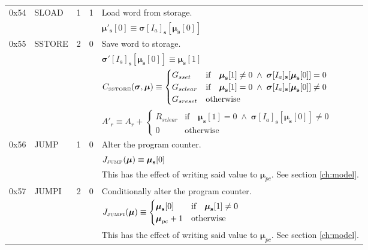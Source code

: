 \documentclass[9pt,oneside]{amsart}
\begin{document}
\begin{tabular*}{\columnwidth}[h]{rlrrl}
\midrule
0x54 & {\small SLOAD} & 1 & 1 & Load word from storage. \\
&&&& $\boldsymbol{\mu}'_\mathbf{s}[0] \equiv \boldsymbol{\sigma}[I_a]_\mathbf{s}[\boldsymbol{\mu}_\mathbf{s}[0]]$ \\
\midrule
0x55 & {\small SSTORE} & 2 & 0 & Save word to storage. \\
&&&& $\boldsymbol{\sigma}'[I_a]_\mathbf{s}[ \boldsymbol{\mu}_\mathbf{s}[0] ] \equiv \boldsymbol{\mu}_\mathbf{s}[1] $ \\
&&&& $C_{\text{\tiny SSTORE}}(\boldsymbol{\sigma}, \boldsymbol{\mu}) \equiv \begin{cases}
G_{sset} & \text{if} \quad \boldsymbol{\mu}_\mathbf{s}[1] \neq 0 \; \wedge \; \boldsymbol{\sigma}[I_a]_\mathbf{s}[\boldsymbol{\mu}_\mathbf{s}[0]] = 0 \\
G_{sclear} & \text{if} \quad \boldsymbol{\mu}_\mathbf{s}[1] = 0 \; \wedge \; \boldsymbol{\sigma}[I_a]_\mathbf{s}[\boldsymbol{\mu}_\mathbf{s}[0]] \neq 0 \\
G_{sreset} & \text{otherwise}
\end{cases}$ \\
&&&& $A'_{r} \equiv A_{r} + \begin{cases}
R_{sclear} & \text{if} \quad \boldsymbol{\mu}_\mathbf{s}[1] = 0 \; \wedge \; \boldsymbol{\sigma}[I_a]_\mathbf{s}[\boldsymbol{\mu}_\mathbf{s}[0]] \neq 0 \\
0 & \text{otherwise}
\end{cases}$ \\
\midrule
0x56 & {\small JUMP} & 1 & 0 & Alter the program counter. \\
&&&& $J_{\text{\tiny JUMP}}(\boldsymbol{\mu}) \equiv \boldsymbol{\mu}_\mathbf{s}[0] $ \\
&&&& This has the effect of writing said value to $\boldsymbol{\mu}_{pc}$. See section \ref{ch:model}. \\
\midrule
0x57 & {\small JUMPI} & 2 & 0 & Conditionally alter the program counter. \\
&&&& $J_{\text{\tiny JUMPI}}(\boldsymbol{\mu}) \equiv \begin{cases} \boldsymbol{\mu}_\mathbf{s}[0] & \text{if} \quad \boldsymbol{\mu}_\mathbf{s}[1] \neq 0 \\ \boldsymbol{\mu}_{pc} + 1 & \text{otherwise} \end{cases} $ \\
&&&& This has the effect of writing said value to $\boldsymbol{\mu}_{pc}$. See section \ref{ch:model}. \\

\end{tabular*}
\end{document}
